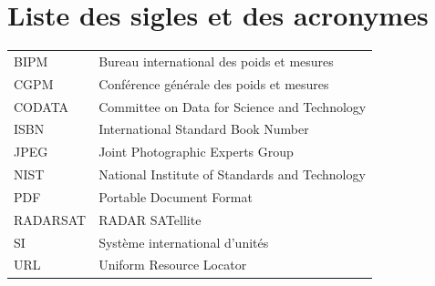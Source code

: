 \chapter{Liste des sigles et des acronymes}


\begin{flushleft}
  \begin{tabular}{@{}ll}
    BIPM        & Bureau international des poids et mesures        \\
    CGPM        & Conférence générale des poids et mesures         \\
    CODATA      & Committee on Data for Science and Technology     \\
    ISBN        & International Standard Book Number               \\
    JPEG        & Joint Photographic Experts Group                 \\
    NIST        & National Institute of Standards and Technology   \\
    PDF         & Portable Document Format                         \\
    RADARSAT    & RADAR SATellite                                  \\
    SI          & Système international d'unités                   \\
    URL         & Uniform Resource Locator                         \\
  \end{tabular}
\end{flushleft}
